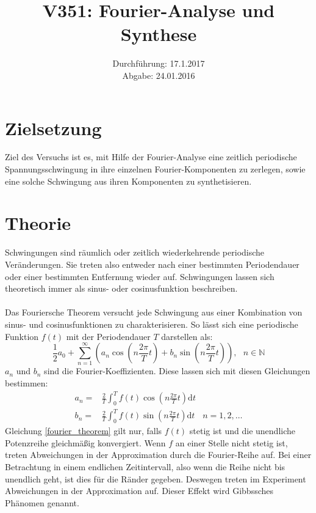 \documentclass[
  bibliography=totoc,     %
  captions=tableheading,  %
  titlepage=firstiscover, %
]{scrartcl}
\title{V351: Fourier-Analyse und Synthese}
\author{
  Simon Schulte
  \texorpdfstring{
    \\
    \href{mailto:simon.schulte@udo.edu}{simon.schulte@udo.edu}
  }{}
  \texorpdfstring{\and}{, }
  Tim Sedlaczek
  \texorpdfstring{
    \\
    \href{mailto:tim.sedlaczek@udo.edu}{tim.sedlaczek@udo.edu}
  }{}
}
\date{Durchführung: 17.1.2017\\
      Abgabe: 24.01.2016}
\begin{document}
\maketitle
\thispagestyle{empty}
\tableofcontents
\newpage
\section{Zielsetzung}
\label{zielsetzung}
Ziel des Versuchs ist es, mit Hilfe der Fourier-Analyse eine zeitlich periodische
Spannungsschwingung in ihre einzelnen Fourier-Komponenten zu zerlegen, sowie
eine solche Schwingung aus ihren Komponenten zu synthetisieren.
\section{Theorie}
\label{theorie}
Schwingungen sind räumlich oder zeitlich wiederkehrende periodische Veränderungen.
Sie treten also entweder nach einer bestimmten Periodendauer oder einer
bestimmten Entfernung wieder auf. Schwingungen lassen sich theoretisch immer
als sinus- oder cosinusfunktion beschreiben. \\
\\
Das Fouriersche Theorem versucht jede Schwingung aus einer Kombination von
sinus- und cosinusfunktionen zu charakterisieren. So lässt sich eine periodische
Funktion $f(t)$ mit der Periodendauer $T$ darstellen als:
\begin{equation}
	\frac{1}{2}a_0+\sum_{n=1}^{\infty}\left(a_n\cos\left(n\frac{2\pi}{T}t\right)+b_n\sin\left(n\frac{2\pi}{T}t\right)\right),\:\:\:n\in\mathbb{N}
	\label{fourier_theorem}
\end{equation}
$a_n$ und $b_n$ sind die Fourier-Koeffizienten. Diese lassen sich mit diesen
Gleichungen bestimmen:
\begin{align}
	a_n=&\frac{2}{T}\int_0^T f(t)\cos\left(n\frac{2\pi}{T}t\right)\mathup{d}t&\\
	b_n=&\frac{2}{T}\int_0^T f(t)\sin\left(n\frac{2\pi}{T}t\right)\mathup{d}t&n=1,2,\ldots
	\label{fourier_koeffizienten}
\end{align}
Gleichung \ref{fourier_theorem} gilt nur, falls $f(t)$ stetig ist und die
unendliche Potenzreihe gleichmäßig konvergiert. Wenn $f$ an einer Stelle nicht
stetig ist, treten Abweichungen in der Approximation durch die Fourier-Reihe
auf. Bei einer Betrachtung in einem endlichen Zeitintervall, also wenn die Reihe
nicht bis unendlich geht, ist dies für die Ränder gegeben. Deswegen treten im
Experiment Abweichungen in der Approximation auf. Dieser Effekt wird Gibbssches
Phänomen genannt.
\end{document}
